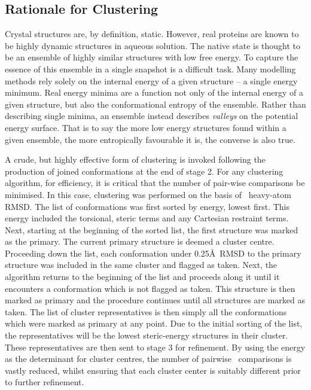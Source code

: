 \subsection{Rationale for Clustering}
\label{section:arcus:cluster}

Crystal structures are, by definition, static. However, real proteins are known to be highly dynamic structures in aqueous solution. The native state is thought to be an ensemble of highly similar structures with low free energy. To capture the essence of this ensemble in a single snapshot is a difficult task. Many modelling methods rely solely on the internal energy of a given structure -- a single energy minimum. Real energy minima are a function not only of the internal energy of a given structure, but also the conformational entropy of the ensemble. Rather than describing single minima, an ensemble  instead describes \emph{valleys} on the potential energy surface. That is to say the more low energy structures found within a given ensemble, the more entropically favourable it is, the converse is also true.



A crude, but highly effective form of clustering is invoked following the production of joined conformations at the end of stage 2. For any clustering algorithm, for efficiency, it is critical that the number of pair-wise comparisons be minimised. In this case, clustering was performed on the basis of \mainchain\ heavy-atom RMSD. The list of conformations was first sorted by energy, lowest first. This energy included the torsional, steric terms and any Cartesian restraint terms. Next, starting at the beginning of the sorted list, the first structure was marked as the primary. The current primary structure is deemed a cluster centre. Proceeding down the list, each conformation under 0.25\AA\ RMSD to the primary structure was included in the same cluster and flagged as taken. Next, the algorithm returns to the beginning of the list and proceeds along it until it encounters a conformation which is not flagged as taken. This structure is then marked as primary and the procedure continues until all structures are marked as taken. The list of cluster representatives is then simply all the conformations which were marked as primary at any point.
Due to the initial sorting of the list, the representatives will be the lowest steric-energy structures in their cluster. These representatives are then sent to stage 3 for refinement. By using the energy as the determinant for cluster centres, the number of pairwise \crms\ comparisons is vastly reduced, whilst ensuring that each cluster center is suitably different prior to further refinement.





